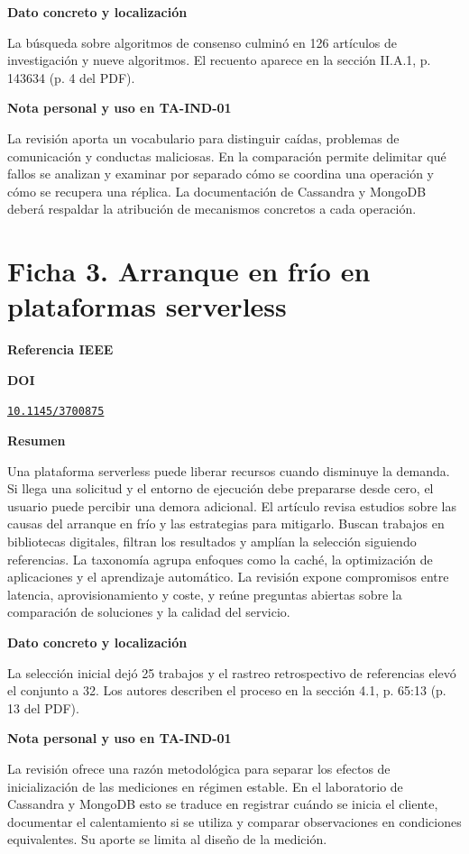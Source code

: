 \documentclass[11pt,a4paper]{article}
\newcommand{\fichabloque}[1]{\par\medskip\textbf{#1}\par\nobreak}
\newcommand{\ficharef}[1]{\begin{otherlanguage}{english}\fullcite{#1}\par\end{otherlanguage}}
\newcommand{\fichadoi}[1]{\href{https://doi.org/#1}{\nolinkurl{#1}}}
\begin{document}
\fichabloque{Dato concreto y localización}
La búsqueda sobre algoritmos de consenso culminó en 126 artículos de investigación y nueve algoritmos. El recuento aparece en la sección II.A.1, p. 143634 (p. 4 del PDF).

\fichabloque{Nota personal y uso en TA-IND-01}
La revisión aporta un vocabulario para distinguir caídas, problemas de comunicación y conductas maliciosas. En la comparación permite delimitar qué fallos se analizan y examinar por separado cómo se coordina una operación y cómo se recupera una réplica. La documentación de Cassandra y MongoDB deberá respaldar la atribución de mecanismos concretos a cada operación.

\clearpage
\section*{Ficha 3. Arranque en frío en plataformas serverless}

\fichabloque{Referencia IEEE}
\ficharef{golec2024coldstart}

\fichabloque{DOI}
\fichadoi{10.1145/3700875}

\fichabloque{Resumen}
Una plataforma serverless puede liberar recursos cuando disminuye la demanda. Si llega una solicitud y el entorno de ejecución debe prepararse desde cero, el usuario puede percibir una demora adicional. El artículo revisa estudios sobre las causas del arranque en frío y las estrategias para mitigarlo. Buscan trabajos en bibliotecas digitales, filtran los resultados y amplían la selección siguiendo referencias. La taxonomía agrupa enfoques como la caché, la optimización de aplicaciones y el aprendizaje automático. La revisión expone compromisos entre latencia, aprovisionamiento y coste, y reúne preguntas abiertas sobre la comparación de soluciones y la calidad del servicio.

\fichabloque{Dato concreto y localización}
La selección inicial dejó 25 trabajos y el rastreo retrospectivo de referencias elevó el conjunto a 32. Los autores describen el proceso en la sección 4.1, p. 65:13 (p. 13 del PDF).

\fichabloque{Nota personal y uso en TA-IND-01}
La revisión ofrece una razón metodológica para separar los efectos de inicialización de las mediciones en régimen estable. En el laboratorio de Cassandra y MongoDB esto se traduce en registrar cuándo se inicia el cliente, documentar el calentamiento si se utiliza y comparar observaciones en condiciones equivalentes. Su aporte se limita al diseño de la medición.
\end{document}
